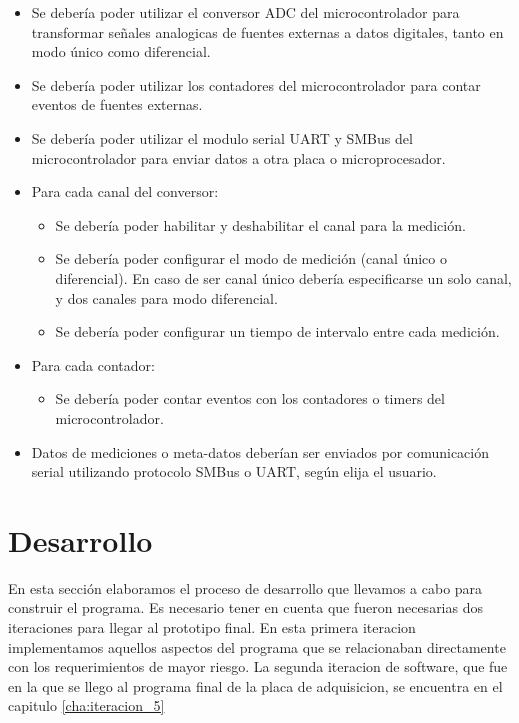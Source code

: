 \begin{itemize}
\item Se debería poder utilizar el conversor ADC del microcontrolador para transformar señales analogicas de fuentes externas a datos digitales, tanto en modo único como diferencial.
\item Se debería poder utilizar los contadores del microcontrolador para contar eventos de fuentes externas.
\item Se debería poder utilizar el modulo serial UART y SMBus del microcontrolador para enviar datos a otra placa o microprocesador.
\item Para cada canal del conversor:
\begin{itemize}
\item Se debería poder habilitar y deshabilitar el canal para la medición.
\item Se debería poder configurar el modo de medición (canal único o diferencial). En caso de ser canal único debería especificarse un solo canal, y dos canales para modo diferencial.
\item Se debería poder configurar un tiempo de intervalo entre cada medición.
\end{itemize}
\item Para cada contador:
\begin{itemize}
\item Se debería poder contar eventos con los contadores o timers del microcontrolador.
\end{itemize}
\item Datos de mediciones o meta-datos deberían ser enviados por comunicación serial utilizando protocolo SMBus o UART, según elija el usuario.

\end{itemize}



\section{Desarrollo} %
\label{it2:sec:desarrollo}

En esta sección elaboramos el proceso de desarrollo que llevamos a cabo para construir el programa. Es necesario tener en cuenta que fueron necesarias dos iteraciones para llegar al prototipo final. En esta primera iteracion implementamos aquellos aspectos del programa que se relacionaban directamente con los requerimientos de mayor riesgo. La segunda iteracion de software, que fue en la que se llego al programa final de la placa de adquisicion, se encuentra en el capitulo \ref{cha:iteracion_5}

